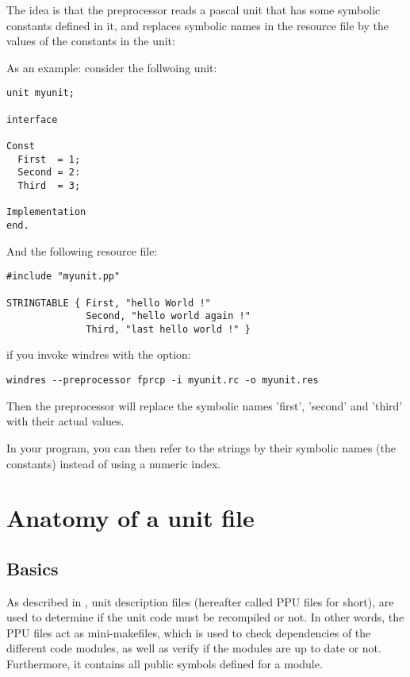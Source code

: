 {The idea is that the preprocessor reads a pascal unit that has some
symbolic constants defined in it, and replaces symbolic names in the
resource file by the values of the constants in the unit:

As an example: consider the follwoing unit:
\begin{verbatim}
unit myunit;

interface

Const
  First  = 1;
  Second = 2:
  Third  = 3;

Implementation
end.
\end{verbatim}
And the following resource file:
\begin{verbatim}
#include "myunit.pp"

STRINGTABLE { First, "hello World !"
              Second, "hello world again !"
              Third, "last hello world !" }

\end{verbatim}
if you invoke windres with the  option:
\begin{verbatim}
windres --preprocessor fprcp -i myunit.rc -o myunit.res
\end{verbatim}
Then the preprocessor will replace the symbolic names 'first', 'second'
and 'third' with their actual values.

In your program, you can then refer to the strings by their symbolic
names (the constants) instead of using a numeric index.

\appendix


\chapter{Anatomy of a unit file}
\label{ch:AppA}

\section{Basics}
As described in , unit description files (hereafter
called PPU files for short), are used to determine if the unit
code must be recompiled or not. In other words, the PPU files act
as mini-makefiles, which is used to check dependencies of the
different code modules, as well as verify if the modules are up
to date or not. Furthermore, it contains all public symbols defined
for a module.

}
